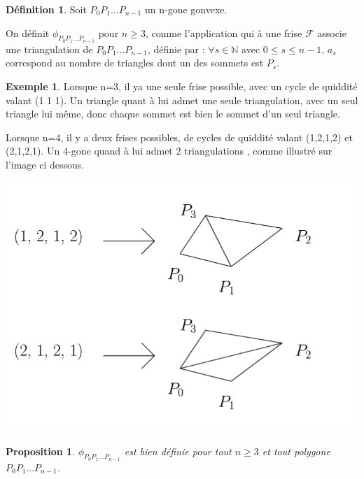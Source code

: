 \documentclass[a4paper]{article}
\theoremstyle{plain}
\newtheorem{prop}[thm]{Proposition}
\theoremstyle{definition}
\newtheorem{defn}{Définition}[section]
\newtheorem{exmp}{Exemple}[section]
\theoremstyle{proof}
\theoremstyle{remark}
\begin{document}
\begin{defn}
Soit $P_0P_1...P_{n-1}$ un n-gone gonvexe.

On définit $\phi_{P_0P_1...P_{n-1}}$ pour $n\ge 3$, comme l'application qui à une frise $\mathcal{F} $ associe une triangulation de $P_0P_1...P_{n-1}$, définie par : $\forall s \in \mathbb{N}$ avec $0\le s\le n-1$, $a_s$ correspond au nombre de triangles dont un des sommets est $P_s$.
\end{defn}

\begin{exmp}
Lorsque n=3, il ya une seule frise possible, avec un cycle de quiddité valant (1 1 1).
Un triangle quant à lui admet une seule triangulation, avec un seul triangle lui même, donc chaque sommet est bien le sommet d'un seul triangle.

Lorsque n=4, il y a deux frises possibles, de cycles de quiddité valant (1,2,1,2) et (2,1,2,1).
Un 4-gone quand à lui admet 2 triangulations , comme illustré sur l'image ci dessous.

\begin{center}
\includegraphics[scale=0.4]{tria.png}
\end{center}
\end{exmp}
\begin{prop}
$\phi_{P_0P_1...P_{n-1}}$ est bien définie pour tout $n\ge 3$ et tout polygone $P_0P_1...P_{n-1}$.
\end{prop}
\end{document}
